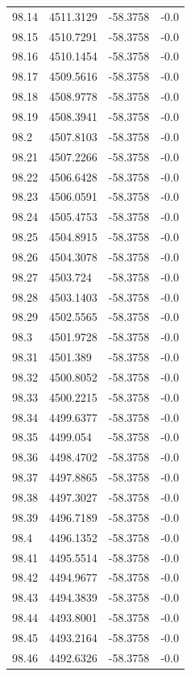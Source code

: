 \begin{table}[H]
\begin{tabular}{llll}
98.14 & 4511.3129 & -58.3758 & -0.0 \\
98.15 & 4510.7291 & -58.3758 & -0.0 \\
98.16 & 4510.1454 & -58.3758 & -0.0 \\
98.17 & 4509.5616 & -58.3758 & -0.0 \\
98.18 & 4508.9778 & -58.3758 & -0.0 \\
98.19 & 4508.3941 & -58.3758 & -0.0 \\
98.2 & 4507.8103 & -58.3758 & -0.0 \\
98.21 & 4507.2266 & -58.3758 & -0.0 \\
98.22 & 4506.6428 & -58.3758 & -0.0 \\
98.23 & 4506.0591 & -58.3758 & -0.0 \\
98.24 & 4505.4753 & -58.3758 & -0.0 \\
98.25 & 4504.8915 & -58.3758 & -0.0 \\
98.26 & 4504.3078 & -58.3758 & -0.0 \\
98.27 & 4503.724 & -58.3758 & -0.0 \\
98.28 & 4503.1403 & -58.3758 & -0.0 \\
98.29 & 4502.5565 & -58.3758 & -0.0 \\
98.3 & 4501.9728 & -58.3758 & -0.0 \\
98.31 & 4501.389 & -58.3758 & -0.0 \\
98.32 & 4500.8052 & -58.3758 & -0.0 \\
98.33 & 4500.2215 & -58.3758 & -0.0 \\
98.34 & 4499.6377 & -58.3758 & -0.0 \\
98.35 & 4499.054 & -58.3758 & -0.0 \\
98.36 & 4498.4702 & -58.3758 & -0.0 \\
98.37 & 4497.8865 & -58.3758 & -0.0 \\
98.38 & 4497.3027 & -58.3758 & -0.0 \\
98.39 & 4496.7189 & -58.3758 & -0.0 \\
98.4 & 4496.1352 & -58.3758 & -0.0 \\
98.41 & 4495.5514 & -58.3758 & -0.0 \\
98.42 & 4494.9677 & -58.3758 & -0.0 \\
98.43 & 4494.3839 & -58.3758 & -0.0 \\
98.44 & 4493.8001 & -58.3758 & -0.0 \\
98.45 & 4493.2164 & -58.3758 & -0.0 \\
98.46 & 4492.6326 & -58.3758 & -0.0 \\

\end{tabular}
\end{table}
